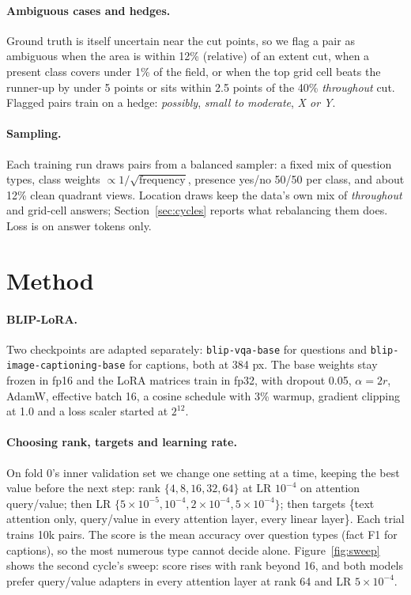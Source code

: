 \documentclass[10pt,twocolumn]{article}
\begin{document}
\paragraph{Ambiguous cases and hedges.} Ground truth is itself uncertain near the cut points, so we flag a pair as ambiguous when the area is within 12\% (relative) of an extent cut, when a present class covers under 1\% of the field, or when the top grid cell beats the runner-up by under 5 points or sits within 2.5 points of the 40\% \emph{throughout} cut. Flagged pairs train on a hedge: \emph{possibly}, \emph{small to moderate}, \emph{X or Y}.

\paragraph{Sampling.} Each training run draws pairs from a balanced sampler: a fixed mix of question types, class weights $\propto 1/\sqrt{\text{frequency}}$, presence yes/no 50/50 per class, and about 12\% clean quadrant views. Location draws keep the data's own mix of \emph{throughout} and grid-cell answers; Section~\ref{sec:cycles} reports what rebalancing them does. Loss is on answer tokens only.

\section{Method}\label{sec:method}
\paragraph{BLIP-LoRA.} Two checkpoints are adapted separately: \texttt{blip-vqa-base} for questions and \texttt{blip-image-captioning-base} for captions, both at 384 px. The base weights stay frozen in fp16 and the LoRA matrices train in fp32, with dropout 0.05, $\alpha = 2r$, AdamW, effective batch 16, a cosine schedule with 3\% warmup, gradient clipping at 1.0 and a loss scaler started at $2^{12}$.

\paragraph{Choosing rank, targets and learning rate.} On fold 0's inner validation set we change one setting at a time, keeping the best value before the next step: rank $\{4, 8, 16, 32, 64\}$ at LR $10^{-4}$ on attention query/value; then LR $\{5\!\times\!10^{-5}, 10^{-4}, 2\!\times\!10^{-4}, 5\!\times\!10^{-4}\}$; then targets \{text attention only, query/value in every attention layer, every linear layer\}. Each trial trains 10k pairs. The score is the mean accuracy over question types (fact F1 for captions), so the most numerous type cannot decide alone. Figure~\ref{fig:sweep} shows the second cycle's sweep: score rises with rank beyond 16, and both models prefer query/value adapters in every attention layer at rank 64 and LR $5\!\times\!10^{-4}$.
\end{document}
